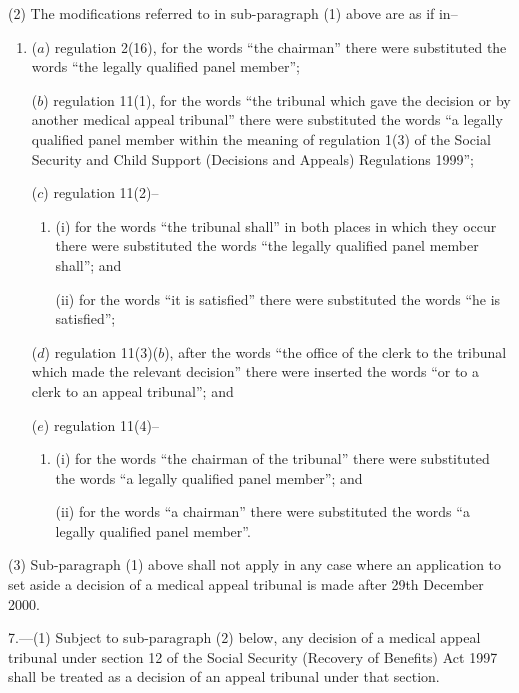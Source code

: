 \documentclass[12pt,a4paper]{article}
\begin{document}
(2) The modifications referred to in sub-paragraph (1) above are as if in–
\begin{enumerate}\item[]
($a$) regulation 2(16), for the words “the chairman” there were substituted the words “the legally qualified panel member”;

($b$) regulation 11(1), for the words “the tribunal which gave the decision or by another medical appeal tribunal” there were substituted the words “a legally qualified panel member within the meaning of regulation 1(3) of the Social Security and Child Support (Decisions and Appeals) Regulations 1999”;

($c$) regulation 11(2)–
\begin{enumerate}\item[]
(i) for the words “the tribunal shall” in both places in which they occur there were substituted the words “the legally qualified panel member shall”; and

(ii) for the words “it is satisfied” there were substituted the words “he is satisfied”;
\end{enumerate}

($d$) regulation 11(3)($b$), after the words “the office of the clerk to the tribunal which made the relevant decision” there were inserted the words “or to a clerk to an appeal tribunal”; and

($e$) regulation 11(4)–
\begin{enumerate}\item[]
(i) for the words “the chairman of the tribunal” there were substituted the words “a legally qualified panel member”; and

(ii) for the words “a chairman” there were substituted the words “a legally qualified panel member”.
\end{enumerate}
\end{enumerate}

(3) Sub-paragraph (1) above shall not apply in any case where an application to set aside a decision of a medical appeal tribunal is made after 29th December 2000.

\medskip

7.---(1)  Subject to sub-paragraph (2) below, any decision of a medical appeal tribunal under section 12 of the Social Security (Recovery of Benefits) Act 1997 shall be treated as a decision of an appeal tribunal under that section.
\end{document}
